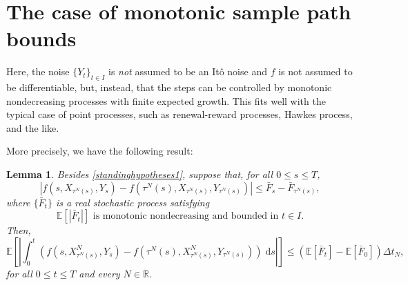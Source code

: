 \documentclass[reqno,12pt]{amsart}
\theoremstyle{plain}%
\newtheorem{lem}{Lemma}[section]
\theoremstyle{definition}
\begin{document}
\section{The case of monotonic sample path bounds}
\label{secmonotonicbound}

Here, the noise $\{Y_t\}_{t\in I}$ is \emph{not} assumed to be an It\^o noise and $f$ is not assumed to be differentiable, but, instead, that the steps can be controlled by monotonic nondecreasing processes with finite expected growth. This fits well with the typical case of point processes, such as renewal-reward processes, Hawkes process, and the like.

More precisely, we have the following result:

\begin{lem}
    \label{lemmonotonicbound}
    Besides \cref{standinghypotheses1}, suppose that, for all $0 \leq s \leq T$,
    \begin{equation}
        \label{stepbound}
          |f(s, X_{\tau^N(s)}, Y_s) - f({\tau^N(s)}, X_{\tau^N(s)}, Y_{\tau^N(s)})| \leq \bar F_s - \bar F_{\tau^N(s)},
      \end{equation}
      where $\{\bar F_t\}$ is a real stochastic process satisfying
      \begin{equation}
        \label{expectstepmonotonic}
        \mathbb{E}[|\bar F_t|] \textrm{ is monotonic nondecreasing and bounded in } t\in I.
      \end{equation}
      Then,
      \begin{equation}
        \label{expectintfboundbyG}
          \mathbb{E}\left[\left|\int_0^t \left( f(s, X_{\tau^N(s)}^N, Y_s) - f(\tau^N(s), X_{\tau^N(s)}^N, Y_{\tau^N(s)}) \right)\;\mathrm{d}s\right|\right] \leq (\mathbb{E}[\bar F_t] - \mathbb{E}[\bar F_0])\Delta t_N,
      \end{equation}
      for all $0 \leq t \leq T$ and every $N\in \mathbb{R}$.
\end{lem}
\end{document}
